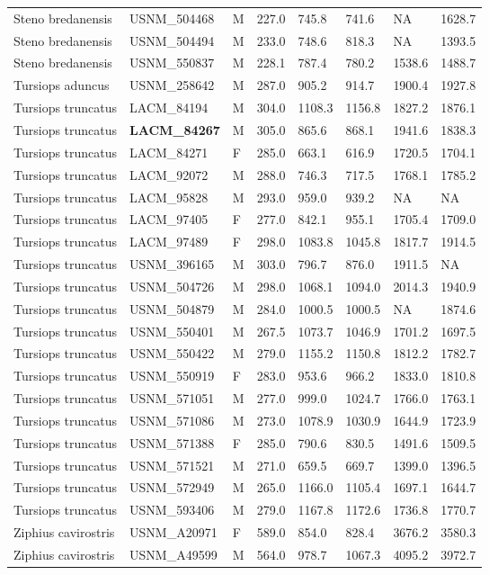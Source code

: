 \begin{longtable}{|p{1.95in}p{1.1in}p{.15in}p{.4in}p{.4in}p{.4in}p{.4in}p{.4in}|}
  Steno bredanensis & USNM\_504468 & M & 227.0 & 745.8 & 741.6 & NA & 1628.7 \\ 
  Steno bredanensis & USNM\_504494 & M & 233.0 & 748.6 & 818.3 & NA & 1393.5 \\ 
  Steno bredanensis & USNM\_550837 & M & 228.1 & 787.4 & 780.2 & 1538.6 & 1488.7 \\ 
  Tursiops aduncus & USNM\_258642 & M & 287.0 & 905.2 & 914.7 & 1900.4 & 1927.8 \\ 
  Tursiops truncatus & LACM\_84194 & M & 304.0 & 1108.3 & 1156.8 & 1827.2 & 1876.1 \\ 
  Tursiops truncatus & \textbf{ LACM\_84267 } & M & 305.0 & 865.6 & 868.1 & 1941.6 & 1838.3 \\ 
  Tursiops truncatus & LACM\_84271 & F & 285.0 & 663.1 & 616.9 & 1720.5 & 1704.1 \\ 
  Tursiops truncatus & LACM\_92072 & M & 288.0 & 746.3 & 717.5 & 1768.1 & 1785.2 \\ 
  Tursiops truncatus & LACM\_95828 & M & 293.0 & 959.0 & 939.2 & NA & NA  \\ 
  Tursiops truncatus & LACM\_97405 & F & 277.0 & 842.1 & 955.1 & 1705.4 & 1709.0 \\ 
  Tursiops truncatus & LACM\_97489 & F & 298.0 & 1083.8 & 1045.8 & 1817.7 & 1914.5 \\ 
  Tursiops truncatus & USNM\_396165 & M & 303.0 & 796.7 & 876.0 & 1911.5 & NA  \\ 
  Tursiops truncatus & USNM\_504726 & M & 298.0 & 1068.1 & 1094.0 & 2014.3 & 1940.9 \\ 
  Tursiops truncatus & USNM\_504879 & M & 284.0 & 1000.5 & 1000.5 & NA & 1874.6 \\ 
  Tursiops truncatus & USNM\_550401 & M & 267.5 & 1073.7 & 1046.9 & 1701.2 & 1697.5 \\ 
  Tursiops truncatus & USNM\_550422 & M & 279.0 & 1155.2 & 1150.8 & 1812.2 & 1782.7 \\ 
  Tursiops truncatus & USNM\_550919 & F & 283.0 & 953.6 & 966.2 & 1833.0 & 1810.8 \\ 
  Tursiops truncatus & USNM\_571051 & M & 277.0 & 999.0 & 1024.7 & 1766.0 & 1763.1 \\ 
  Tursiops truncatus & USNM\_571086 & M & 273.0 & 1078.9 & 1030.9 & 1644.9 & 1723.9 \\ 
  Tursiops truncatus & USNM\_571388 & F & 285.0 & 790.6 & 830.5 & 1491.6 & 1509.5 \\ 
  Tursiops truncatus & USNM\_571521 & M & 271.0 & 659.5 & 669.7 & 1399.0 & 1396.5 \\ 
  Tursiops truncatus & USNM\_572949 & M & 265.0 & 1166.0 & 1105.4 & 1697.1 & 1644.7 \\ 
  Tursiops truncatus & USNM\_593406 & M & 279.0 & 1167.8 & 1172.6 & 1736.8 & 1770.7 \\ 
  Ziphius cavirostris & USNM\_A20971 & F & 589.0 & 854.0 & 828.4 & 3676.2 & 3580.3 \\ 
  Ziphius cavirostris & USNM\_A49599 & M & 564.0 & 978.7 & 1067.3 & 4095.2 & 3972.7 \\ 
   \hline
\end{longtable}

